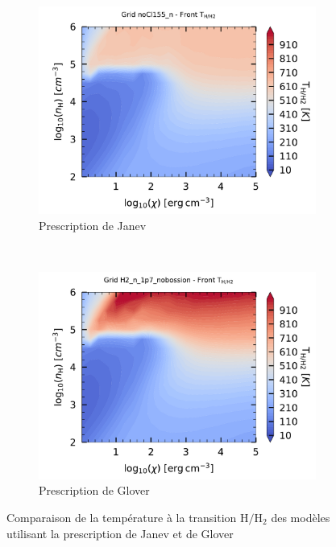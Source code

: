 \begin{figure}[!h]
    \centering
    \begin{subfigure}[t]{0.49\textwidth} %
        \centering \includegraphics[trim = {0 0 0 1cm },clip,width=1\textwidth]{figure/H2/grid_janev/HH2_T.pdf}
        \caption{Prescription de Janev}
    \end{subfigure}
    ~ 
    \begin{subfigure}[t]{0.49\textwidth}
        \centering \includegraphics[trim = {0 0 0 1cm },clip,width=1\textwidth]{figure/H2/grid_glover/HH2_T.pdf}
        \caption{Prescription de Glover}
    \end{subfigure}
    \caption{Comparaison de la température à la transition $\mathrm{H}/\mathrm{H}_2$ des modèles utilisant la prescription de Janev et de Glover}
    \label{fig:H2:JanevGlover:THH2}
\end{figure}

